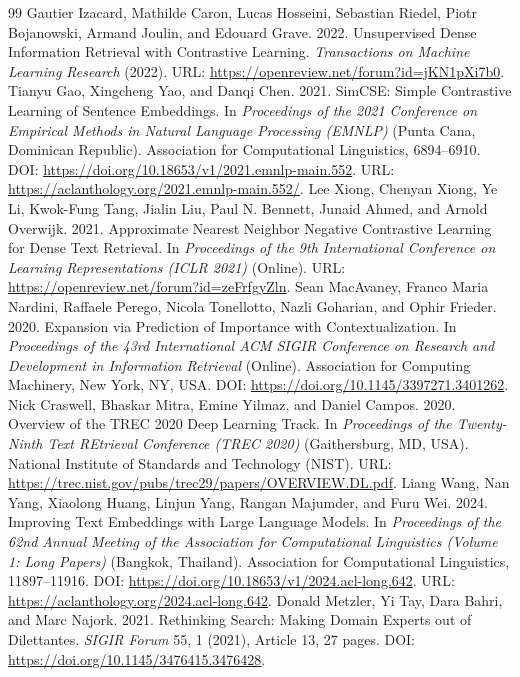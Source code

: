\documentclass[sigconf,anonymous,screen]{acmart}
\begin{document}
\begin{thebibliography}{99}
 Gautier Izacard, Mathilde Caron, Lucas Hosseini, Sebastian Riedel, Piotr Bojanowski, Armand Joulin, and Edouard Grave. 2022. Unsupervised Dense Information Retrieval with Contrastive Learning. \textit{Transactions on Machine Learning Research} (2022). URL: \url{https://openreview.net/forum?id=jKN1pXi7b0}.
 Tianyu Gao, Xingcheng Yao, and Danqi Chen. 2021. SimCSE: Simple Contrastive Learning of Sentence Embeddings. In \textit{Proceedings of the 2021 Conference on Empirical Methods in Natural Language Processing (EMNLP)} (Punta Cana, Dominican Republic). Association for Computational Linguistics, 6894--6910. DOI: \url{https://doi.org/10.18653/v1/2021.emnlp-main.552}. URL: \url{https://aclanthology.org/2021.emnlp-main.552/}.
 Lee Xiong, Chenyan Xiong, Ye Li, Kwok-Fung Tang, Jialin Liu, Paul N. Bennett, Junaid Ahmed, and Arnold Overwijk. 2021. Approximate Nearest Neighbor Negative Contrastive Learning for Dense Text Retrieval. In \textit{Proceedings of the 9th International Conference on Learning Representations (ICLR 2021)} (Online). URL: \url{https://openreview.net/forum?id=zeFrfgyZln}.
 Sean MacAvaney, Franco Maria Nardini, Raffaele Perego, Nicola Tonellotto, Nazli Goharian, and Ophir Frieder. 2020. Expansion via Prediction of Importance with Contextualization. In \textit{Proceedings of the 43rd International ACM SIGIR Conference on Research and Development in Information Retrieval} (Online). Association for Computing Machinery, New York, NY, USA. DOI: \url{https://doi.org/10.1145/3397271.3401262}.
 Nick Craswell, Bhaskar Mitra, Emine Yilmaz, and Daniel Campos. 2020. Overview of the TREC 2020 Deep Learning Track. In \textit{Proceedings of the Twenty-Ninth Text REtrieval Conference (TREC 2020)} (Gaithersburg, MD, USA). National Institute of Standards and Technology (NIST). URL: \url{https://trec.nist.gov/pubs/trec29/papers/OVERVIEW.DL.pdf}.
 Liang Wang, Nan Yang, Xiaolong Huang, Linjun Yang, Rangan Majumder, and Furu Wei. 2024. Improving Text Embeddings with Large Language Models. In \textit{Proceedings of the 62nd Annual Meeting of the Association for Computational Linguistics (Volume 1: Long Papers)} (Bangkok, Thailand). Association for Computational Linguistics, 11897--11916. DOI: \url{https://doi.org/10.18653/v1/2024.acl-long.642}. URL: \url{https://aclanthology.org/2024.acl-long.642}.
 Donald Metzler, Yi Tay, Dara Bahri, and Marc Najork. 2021. Rethinking Search: Making Domain Experts out of Dilettantes. \textit{SIGIR Forum} 55, 1 (2021), Article 13, 27 pages. DOI: \url{https://doi.org/10.1145/3476415.3476428}.

\end{thebibliography}
\end{document}
